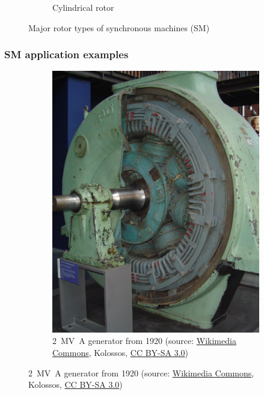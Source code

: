 \begin{frame}
\begin{figure}
\begin{subfigure}{0.49\textwidth}
			\caption{Cylindrical rotor}
		\end{subfigure}
        \caption{Major rotor types of synchronous machines (SM)} 
        \label{fig:examples_SM_rotor}
	\end{figure}
\end{frame}

\begin{frame}
	\frametitle{SM application examples}
	\begin{figure}
		\centering
		\begin{subfigure}{0.49\textwidth}
			\centering
			\includegraphics[height=0.55\textheight]{fig/lec07/Salient_pole_rotor.jpg}
			\caption{\SI{2}{\mega\volt\ampere} generator from 1920 (source: \href{hhttps://commons.wikimedia.org/wiki/File:Drehstrom-Synchron-Generator.jpg}{Wikimedia Commons}, Kolossos, \href{https://creativecommons.org/licenses/by-sa/3.0/deed}{CC BY-SA 3.0})}
		\end{subfigure}

\end{figure}
\end{frame}
